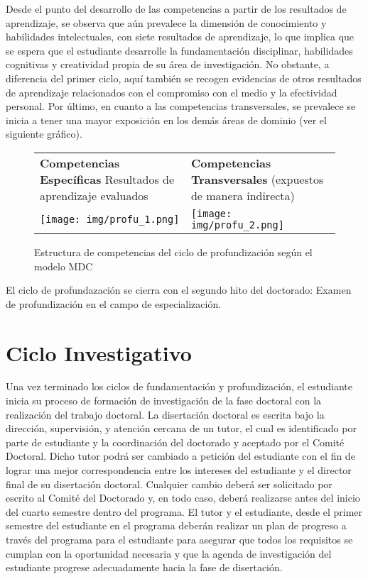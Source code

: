 Desde el punto del desarrollo de las competencias a partir de los resultados de aprendizaje, se observa que aún prevalece la dimensión de conocimiento y habilidades intelectuales, con siete resultados de aprendizaje, lo que implica que se espera que el estudiante desarrolle la fundamentación disciplinar, habilidades cognitivas y creatividad propia de su área de investigación. No obstante, a diferencia del primer ciclo, aquí también se recogen evidencias de otros resultados de aprendizaje relacionados con el compromiso con el medio y la efectividad personal. Por último, en cuanto a las competencias transversales, se prevalece se inicia a tener una mayor exposición en los demás áreas de dominio (ver el siguiente gráfico).

\begin{figure}[H]
\caption{Estructura de competencias del ciclo de profundización según el modelo MDC \label{Estructura} }
\begin{center}
\begin{tabular}{p{}|p{}}
   \textbf{Competencias Específicas}
Resultados de aprendizaje evaluados
  & \textbf{Competencias Transversales} (expuestos de manera indirecta)  \\
  \texttt{[image: img/profu\_1.png]}   &  \texttt{[image: img/profu\_2.png]}
\end{tabular}

\end{center}
\end{figure}

El ciclo de profundazación se cierra con el segundo hito del doctorado: Examen de profundización en el campo de especialización. 

\section{Ciclo Investigativo}

Una vez terminado los ciclos de fundamentación y profundización, el estudiante inicia su proceso de formación de investigación de la fase doctoral con la realización del trabajo doctoral. La disertación doctoral es escrita bajo la dirección, supervisión, y atención cercana de un tutor, el cual es identificado por parte de estudiante y la coordinación del doctorado y aceptado por el Comité Doctoral.  Dicho tutor podrá ser cambiado a petición del estudiante con el fin de lograr una mejor correspondencia entre los intereses del estudiante y el director final de su disertación doctoral. Cualquier cambio deberá ser solicitado por escrito al Comité del Doctorado y, en todo caso, deberá realizarse antes del inicio del cuarto semestre dentro del programa. El tutor y el estudiante, desde el primer semestre del estudiante en el programa deberán realizar un plan de progreso a través del programa para el estudiante para asegurar que todos los requisitos se cumplan con la oportunidad necesaria y que la agenda de investigación del estudiante progrese adecuadamente hacia la fase de disertación.

